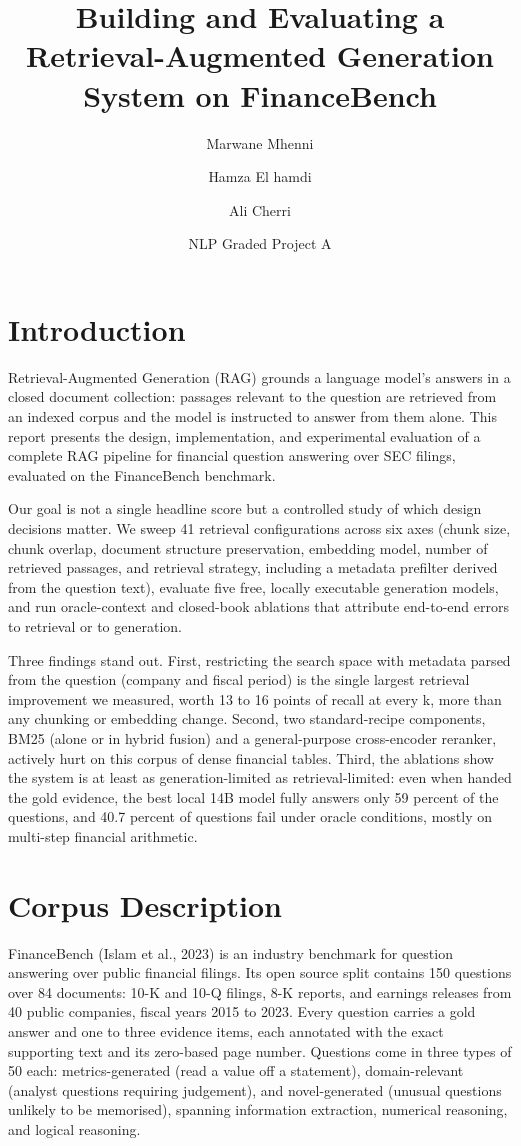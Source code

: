 \documentclass[
  11pt,
]{article}
\title{Building and Evaluating a Retrieval-Augmented Generation System
on FinanceBench}
\author{Marwane Mhenni \and Hamza El hamdi \and Ali Cherri}
\date{NLP Graded Project A}
\begin{document}
\maketitle

\section{Introduction}\label{introduction}

Retrieval-Augmented Generation (RAG) grounds a language model's answers
in a closed document collection: passages relevant to the question are
retrieved from an indexed corpus and the model is instructed to answer
from them alone. This report presents the design, implementation, and
experimental evaluation of a complete RAG pipeline for financial
question answering over SEC filings, evaluated on the FinanceBench
benchmark.

Our goal is not a single headline score but a controlled study of which
design decisions matter. We sweep 41 retrieval configurations across six
axes (chunk size, chunk overlap, document structure preservation,
embedding model, number of retrieved passages, and retrieval strategy,
including a metadata prefilter derived from the question text), evaluate
five free, locally executable generation models, and run oracle-context
and closed-book ablations that attribute end-to-end errors to retrieval
or to generation.

Three findings stand out. First, restricting the search space with
metadata parsed from the question (company and fiscal period) is the
single largest retrieval improvement we measured, worth 13 to 16 points
of recall at every k, more than any chunking or embedding change.
Second, two standard-recipe components, BM25 (alone or in hybrid fusion)
and a general-purpose cross-encoder reranker, actively hurt on this
corpus of dense financial tables. Third, the ablations show the system
is at least as generation-limited as retrieval-limited: even when handed
the gold evidence, the best local 14B model fully answers only 59
percent of the questions, and 40.7 percent of questions fail under
oracle conditions, mostly on multi-step financial arithmetic.

\section{Corpus Description}\label{corpus-description}

FinanceBench (Islam et al., 2023) is an industry benchmark for question
answering over public financial filings. Its open source split contains
150 questions over 84 documents: 10-K and 10-Q filings, 8-K reports, and
earnings releases from 40 public companies, fiscal years 2015 to 2023.
Every question carries a gold answer and one to three evidence items,
each annotated with the exact supporting text and its zero-based page
number. Questions come in three types of 50 each: metrics-generated
(read a value off a statement), domain-relevant (analyst questions
requiring judgement), and novel-generated (unusual questions unlikely to
be memorised), spanning information extraction, numerical reasoning, and
logical reasoning.
\end{document}
